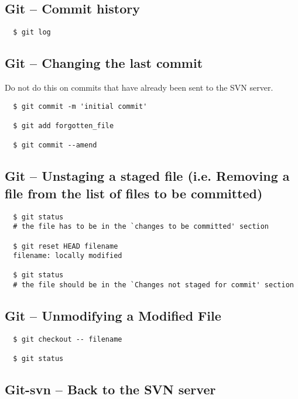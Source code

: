 \documentclass[11pt,twoside]{article}
\begin{document}
\subsection*{Git -- Commit history}

\begin{verbatim}
  $ git log
\end{verbatim}

\subsection*{Git -- Changing the last commit}

Do not do this on commits that have already been sent to the SVN server.

\begin{verbatim}
  $ git commit -m 'initial commit'

  $ git add forgotten_file

  $ git commit --amend
\end{verbatim}

\subsection*{Git -- Unstaging a staged file (i.e. Removing a file from the list of files to be
committed)}

\begin{verbatim}
  $ git status
  # the file has to be in the `changes to be committed' section

  $ git reset HEAD filename
  filename: locally modified

  $ git status
  # the file should be in the `Changes not staged for commit' section
\end{verbatim}

\subsection*{Git -- Unmodifying a Modified File}

\begin{verbatim}
  $ git checkout -- filename

  $ git status
\end{verbatim}

\subsection*{Git-svn -- Back to the SVN server}
\end{document}
